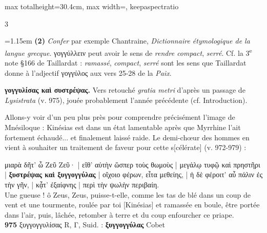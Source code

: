 \documentclass[11pt,twoside]{book}
\newcommand{\italique}[1]{\textit{#1}}
\newcommand{\citComm}[1]{\begin{quoting}[vskip=0.4pt,leftmargin=0.7em,rightmargin=0.2em]#1\end{quoting}}
\newcommand{\nieme}[1]{#1\textsuperscript{e}}
\newcommand{\lecon}[1]{\textbf{#1}}
\begin{document}
\begin{adjustbox}{max totalheight=30.4cm, max width=\textwidth, keepaspectratio}
\begin{minipage}{\textwidth}
{\begin{multicols}{3}
\par\vspace{1.5pt}
\noindent\hangindent=1.15em {\color{sepiaNote}\textbf{(2)}} \italique{Confer} par exemple Chantraine, \italique{Dictionnaire étymologique de la langue grecque}. γογγύλλειν peut avoir le sens de \italique{rendre compact}, \italique{serré}. Cf. la \nieme{3} note §166 de Taillardat : \italique{ramassé}, \italique{compact}, \italique{serré} sont les sens que Taillardat donne à l'adjectif γογγύλος aux vers 25-28 de la \italique{Paix}.
\par\vspace{1.5pt}
 \textbf{γογγυλίσας καὶ συστρέψας.} Vers retouché \italique{gratia metri} d'après un passage de \italique{Lysistrata} (v. 975), jouée probablement l'année précédente (cf. Introduction).
\par\vspace{1.5pt}
\noindent Allons-y voir d'un peu plus près pour comprendre précisément l'image de Mnésiloque : Kinésias est dans un état lamentable après que Myrrhine l'ait fortement échaudé... et finalement laissé raide. Le demi-chœur des hommes en vient à souhaiter un traitement de faveur pour cette s[célérate] (v. 972-979) :
\citComm{μιαρὰ δῆτ' ὦ Ζεῦ Ζεῦ· |
εἴθ' αὐτὴν ὥσπερ τοὺς θωμοὺς |
μεγάλῳ τυφῷ καὶ πρηστῆρι |
\textbf{ξυστρέψας καὶ ξυγγογγύλας} |
οἴχοιο φέρων, εἶτα μεθείης, |
ἡ δὲ φέροιτ' αὖ πάλιν ἐς τὴν γῆν, |
κᾆτ' ἐξαίφνης |
περὶ τὴν ψωλὴν περιβαίη.\\
Une gueuse ! ô Zeus, Zeus, puisse-t-elle, comme les tas de blé dans un coup de vent et une tourmente, roulée par toi [Kinésias] et ramassée en boule, être portée dans l'air, puis, lâchée, retomber à terre et du coup enfourcher ce priape.\\
\textbf{975} ξυγγογγυλίσας R, Γ, Suid. : \lecon{ξυγγογγύλας} Cobet}
\par\end{multicols}}
\end{minipage}\end{adjustbox}
\newpage
\end{document}

